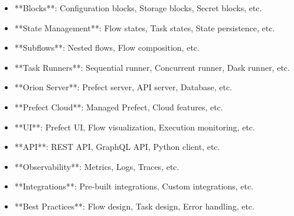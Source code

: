 \documentclass[11pt,a4paper]{article}
\begin{document}
\begin{itemize}
\item **Blocks**: Configuration blocks, Storage blocks, Secret blocks, etc.
\end{itemize}

\begin{itemize}
\item **State Management**: Flow states, Task states, State persistence, etc.
\end{itemize}

\begin{itemize}
\item **Subflows**: Nested flows, Flow composition, etc.
\end{itemize}

\begin{itemize}
\item **Task Runners**: Sequential runner, Concurrent runner, Dask runner, etc.
\end{itemize}

\begin{itemize}
\item **Orion Server**: Prefect server, API server, Database, etc.
\end{itemize}

\begin{itemize}
\item **Prefect Cloud**: Managed Prefect, Cloud features, etc.
\end{itemize}

\begin{itemize}
\item **UI**: Prefect UI, Flow visualization, Execution monitoring, etc.
\end{itemize}

\begin{itemize}
\item **API**: REST API, GraphQL API, Python client, etc.
\end{itemize}

\begin{itemize}
\item **Observability**: Metrics, Logs, Traces, etc.
\end{itemize}

\begin{itemize}
\item **Integrations**: Pre-built integrations, Custom integrations, etc.
\end{itemize}

\begin{itemize}
\item **Best Practices**: Flow design, Task design, Error handling, etc.
\end{itemize}
\end{document}
